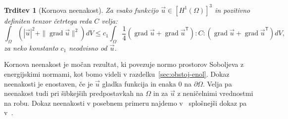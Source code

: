 \documentclass[12pt,a4paper,twoside]{article}
\theoremstyle{definition} %
\theoremstyle{plain} %
\newtheorem{trditev}[definicija]{Trditev}
\numberwithin{equation}{section}
\newcommand{\T}{\mathsf{T}}
\newcommand{\grad}{\operatorname{grad}}
\newcommand{\vu}{\vec{u}}
\begin{document}


\begin{trditev}[Kornova neenakost]
  \label{trd:korn}
  Za vsako funkcijo $\vu \in [H^1(\Omega)]^3$ in pozitivno definiten tenzor četrtega reda $C$ velja:
  \begin{equation}
     \int_{\Omega} (|\vu|^2 + \|\grad \vu\|^2) dV \leq c_1 \int_{\Omega}  \frac14 (\grad \vu + \grad
     \vu^\T) :C: (\grad \vu + \grad \vu^\T)dV,
  \end{equation}
  za neko konstanto $c_1$ neodvisno od $\vu$.
\end{trditev}
Kornova neenakost je močan rezultat, ki povezuje normo prostorov Soboljeva z
energijskimi normami, kot bomo videli v razdelku~\ref{sec:obstoj-enol}. Dokaz neenakosti je
enostaven, če je $\vu$ gladka funkcija in enaka 0 na $\partial\Omega$. Velja pa neenakost tudi pri
šibkejših predpostavkah na $\Omega$ in za $\vu$ z neničelnimi vrednostmi na robu.
Dokaz neenakosti v posebnem primeru najdemo v~\cite[str.\ 229]{lebedev2009introduction} splošnejši
dokaz pa v~\cite{ciarlet2010korn}.
\end{document}
